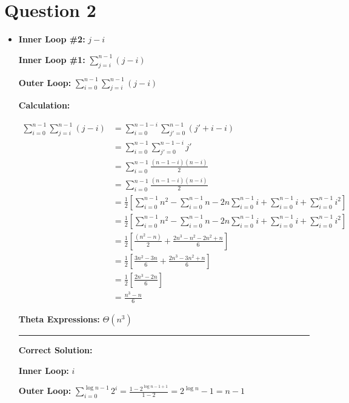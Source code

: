 \documentclass[12pt]{article}
\begin{document}
\section*{Question 2}
\begin{itemize}

    \item

    \textbf{Inner Loop \#2:} $j - i$

    \textbf{Inner Loop \#1:} $\sum\limits_{j=i}^{n - 1} (j - i)$

    \textbf{Outer Loop:} $\sum\limits_{i=0}^{n-1}\sum\limits_{j=i}^{n - 1} (j - i)$

    \textbf{Calculation:}

    \begin{align}
        \sum\limits_{i=0}^{n-1}\sum\limits_{j=i}^{n - 1} (j - i) &= \sum\limits_{i=0}^{n-1-i}\sum\limits_{j'=0}^{n - 1} (j' + i - i)\\
        &= \sum\limits_{i=0}^{n-1}\sum\limits_{j'=0}^{n-1-i} j'\\
        &= \sum\limits_{i=0}^{n-1} \frac{(n-1-i)(n-i)}{2}\\
        &= \sum\limits_{i=0}^{n-1} \frac{(n-1-i)(n-i)}{2}\\
        &= \frac{1}{2} \left[ \sum\limits_{i=0}^{n-1} n^2 - \sum\limits_{i=0}^{n-1} n - 2n \sum\limits_{i=0}^{n-1} i + \sum\limits_{i=0}^{n-1} i + \sum\limits_{i=0}^{n-1} i^2 \right]\\
        &= \frac{1}{2} \left[ \sum\limits_{i=0}^{n-1} n^2 - \sum\limits_{i=0}^{n-1} n - 2n \sum\limits_{i=0}^{n-1} i + \sum\limits_{i=0}^{n-1} i + \sum\limits_{i=0}^{n-1} i^2 \right]\\
        &= \frac{1}{2} \left[ \frac{(n^2 - n)}{2} + \frac{2n^3 - n^2 - 2n^2 + n}{6} \right]\\
        &= \frac{1}{2} \left[ \frac{3n^2 - 3n}{6} + \frac{2n^3 - 3n^2 + n}{6} \right]\\
        &= \frac{1}{2} \left[ \frac{2n^3 - 2n}{6} \right]\\
        &= \frac{n^3 - n}{6}
    \end{align}

    \textbf{Theta Expressions:} $\Theta (n^3)$

    \noindent\rule{\textwidth}{1pt}

    \textbf{Correct Solution:}

    \bigskip

    \textbf{Inner Loop:} $i$

    \textbf{Outer Loop:} $\sum\limits_{i=0}^{\log n - 1} 2^i = \displaystyle\frac{1 - 2^{\log n - 1 + 1}}{1 - 2} = 2^{\log n} - 1 = n - 1$


\end{itemize}
\end{document}
